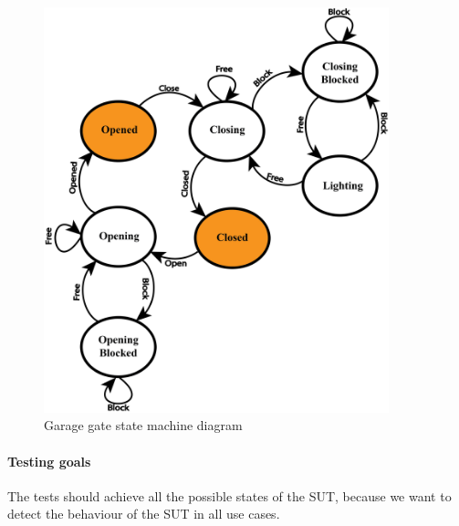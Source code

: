 \begin{figure}[!ht]
\centering
\includegraphics[width=100mm, keepaspectratio]{figures/garageState.png}
\caption{Garage gate state machine diagram}
\label{fig:Garage Statemachine}
\end{figure}

\paragraph{Testing goals}
The tests should achieve all the possible states of the SUT, because we want to detect the behaviour of the SUT in all use cases.